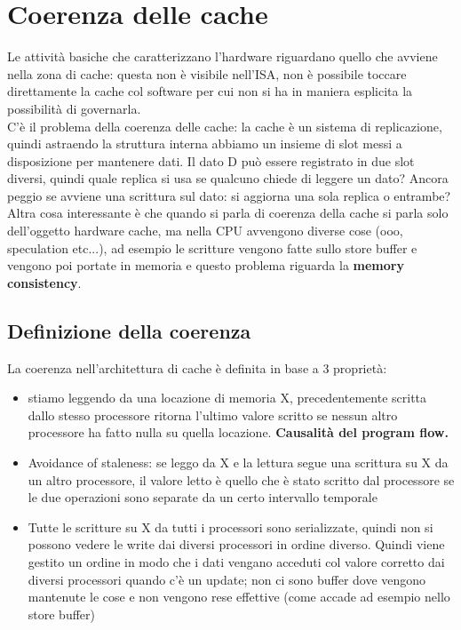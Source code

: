 \documentclass[12pt, oneside]{extbook}
\begin{document}
\section{Coerenza delle cache}
Le attività basiche che caratterizzano l'hardware riguardano quello che avviene nella zona di cache: questa non è visibile nell'ISA, non è possibile toccare direttamente la cache col software per cui non si ha in maniera esplicita la possibilità di governarla.\\ C'è il problema della coerenza delle cache: la cache è un sistema di replicazione, quindi astraendo la struttura interna abbiamo un insieme di slot messi a disposizione per mantenere dati. Il dato D può essere registrato in due slot diversi, quindi quale replica si usa se qualcuno chiede di leggere un dato? Ancora peggio se avviene una scrittura sul dato: si aggiorna una sola replica o entrambe? Altra cosa interessante è che quando si parla di coerenza della cache si parla solo dell'oggetto hardware cache, ma nella CPU avvengono diverse cose (ooo, speculation etc...), ad esempio le scritture vengono fatte sullo store buffer e vengono poi portate in memoria e questo problema riguarda la \textbf{memory consistency}.
\subsection{Definizione della coerenza}
La coerenza nell'architettura di cache è definita in base a 3 proprietà:
\begin{itemize}
\item stiamo leggendo da una locazione di memoria X, precedentemente scritta dallo stesso processore ritorna l'ultimo valore scritto se nessun altro processore ha fatto nulla su quella locazione. \textbf{Causalità del program flow.}
\item {Avoidance of staleness}: se leggo da X e la lettura segue una scrittura su X da un altro processore, il valore letto è quello che è stato scritto dal processore se le due operazioni sono separate da un certo intervallo temporale
\item Tutte le scritture su X da tutti i processori sono serializzate, quindi non si possono vedere le write dai diversi processori in ordine diverso. Quindi viene gestito un ordine in modo che i dati vengano acceduti col valore corretto dai diversi processori quando c'è un update; non ci sono buffer dove vengono mantenute le cose e non vengono rese effettive (come accade ad esempio nello store buffer)
\end{itemize}
\end{document}
